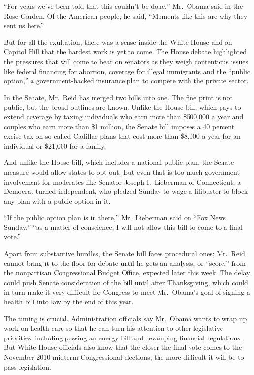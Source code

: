 ﻿\documentclass[12pt]{article}
\begin{document}
``For years we've been told that this couldn't be done,'' Mr.~Obama said in the Rose Garden. Of the
American people, he said, ``Moments like this are why they sent us here.''

But for all the exultation, there was a sense inside the White House and on Capitol Hill that the
hardest work is yet to come. The House debate highlighted the pressures that will come to bear on
senators as they weigh contentious issues like federal financing for abortion, coverage for illegal
immigrants and the ``public option,'' a government-backed insurance plan to compete with the private
sector.

In the Senate, Mr.~Reid has merged two bills into one. The fine print is not public, but the broad
outlines are known. Unlike the House bill, which pays to extend coverage by taxing individuals who
earn more than \$500,000 a year and couples who earn more than \$1 million, the Senate bill imposes
a 40 percent excise tax on so-called Cadillac plans that cost more than \$8,000 a year for an
individual or \$21,000 for a family.

And unlike the House bill, which includes a national public plan, the Senate measure would allow
states to opt out. But even that is too much government involvement for moderates like Senator
Joseph I.~Lieberman of Connecticut, a Democrat-turned-independent, who pledged Sunday to wage a
filibuster to block any plan with a public option in it.

``If the public option plan is in there,'' Mr.~Lieberman said on ``Fox News Sunday,'' ``as a matter
of conscience, I will not allow this bill to come to a final vote.''

Apart from substantive hurdles, the Senate bill faces procedural ones; Mr.~Reid cannot bring it to
the floor for debate until he gets an analysis, or ``score,'' from the nonpartisan Congressional
Budget Office, expected later this week. The delay could push Senate consideration of the bill until
after Thanksgiving, which could in turn make it very difficult for Congress to meet Mr.~Obama's goal
of signing a health bill into law by the end of this year.

The timing is crucial. Administration officials say Mr.~Obama wants to wrap up work on health care
so that he can turn his attention to other legislative priorities, including passing an energy bill
and revamping financial regulations. But White House officials also know that the closer the final
vote comes to the November 2010 midterm Congressional elections, the more difficult it will be to
pass legislation.
\end{document}
